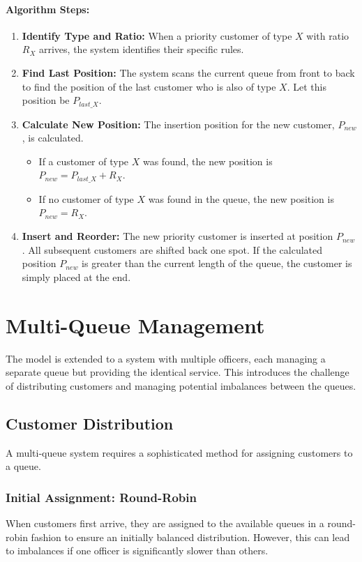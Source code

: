 \documentclass[12pt,a4paper]{report}
\begin{document}
\paragraph{Algorithm Steps:}
\begin{enumerate}
    \item \textbf{Identify Type and Ratio:} When a priority customer of type $X$ with ratio $R_X$ arrives, the system identifies their specific rules.
    \item \textbf{Find Last Position:} The system scans the current queue from front to back to find the position of the last customer who is also of type $X$. Let this position be $P_{last\_X}$.
    \item \textbf{Calculate New Position:} The insertion position for the new customer, $P_{new}$, is calculated.
    \begin{itemize}
        \item If a customer of type $X$ was found, the new position is $P_{new} = P_{last\_X} + R_X$.
        \item If no customer of type $X$ was found in the queue, the new position is $P_{new} = R_X$.
    \end{itemize}
    \item \textbf{Insert and Reorder:} The new priority customer is inserted at position $P_{new}$. All subsequent customers are shifted back one spot. If the calculated position $P_{new}$ is greater than the current length of the queue, the customer is simply placed at the end.
\end{enumerate}

\section{Multi-Queue Management}
The model is extended to a system with multiple officers, each managing a separate queue but providing the identical service. This introduces the challenge of distributing customers and managing potential imbalances between the queues.

\subsection{Customer Distribution}
A multi-queue system requires a sophisticated method for assigning customers to a queue.
\subsubsection{Initial Assignment: Round-Robin}
When customers first arrive, they are assigned to the available queues in a round-robin fashion to ensure an initially balanced distribution. However, this can lead to imbalances if one officer is significantly slower than others.
\end{document}
